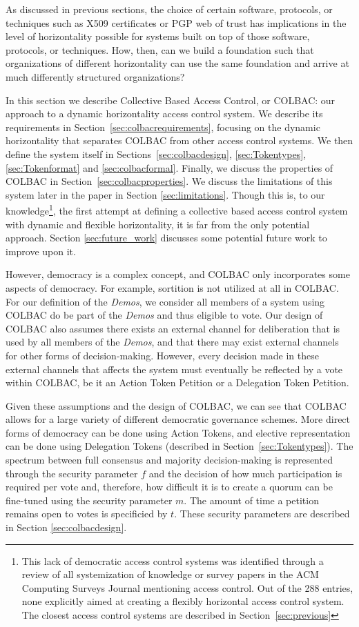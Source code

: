 As discussed in previous sections, the choice of certain software, protocols, or
techniques such as X509 certificates or PGP web of trust has implications in the
level of horizontality possible for systems built on top of those software,
protocols, or techniques. How, then, can we build a foundation such that
organizations of different horizontality can use the same foundation and arrive
at much differently structured organizations?

In this section we describe Collective Based Access Control, or COLBAC: our
approach to a dynamic horizontality access control system. We describe its
requirements in Section~\ref{sec:colbacrequirements}, focusing on the dynamic
horizontality that separates COLBAC from other access control systems. We then
define the system itself in Sections~\ref{sec:colbacdesign},
\ref{sec:Tokentypes}, \ref{sec:Tokenformat} and \ref{sec:colbacformal}.
Finally, we discuss the properties of COLBAC in
Section~\ref{sec:colbacproperties}. We discuss the limitations of this system
later in the paper in Section \ref{sec:limitations}. Though this is, to our
knowledge\footnote{This lack of democratic access control systems was identified
through a review of all systemization of knowledge or survey papers in the ACM
Computing Surveys Journal mentioning access control. Out of the 288 entries,
none explicitly aimed at creating a flexibly horizontal access control system.
The closest access control systems are described in Section~\ref{sec:previous}},
the first attempt at defining a collective based access control system with
dynamic and flexible horizontality, it is far from the only potential approach.
Section \ref{sec:future_work} discusses some potential future work to improve
upon it.

However, democracy is a complex concept, and COLBAC only incorporates some
aspects of democracy. For example, sortition is not utilized at all in COLBAC.
For our definition of the \textit{Demos}, we consider all members of a system
using COLBAC do be part of the \textit{Demos} and thus eligible to vote. Our
design of COLBAC also assumes there exists an external channel for deliberation
that is used by all members of the \textit{Demos}, and that there may exist
external channels for other forms of decision-making. However, every decision
made in these external channels that affects the system must eventually be
reflected by a vote within COLBAC, be it an Action Token Petition or a
Delegation Token Petition.

Given these assumptions and the design of COLBAC, we can see that COLBAC allows
for a large variety of different democratic governance schemes. More direct
forms of democracy can be done using Action Tokens, and elective representation
can be done using Delegation Tokens (described in Section~\ref{sec:Tokentypes}).
The spectrum between full consensus and majority decision-making is represented
through the security parameter $f$ and the decision of how much participation is
required per vote and, therefore, how difficult it is to create a quorum can be
fine-tuned using the security parameter $m$. The amount of time a petition
remains open to votes is specificied by $t$. These security parameters are
described in Section \ref{sec:colbacdesign}.


